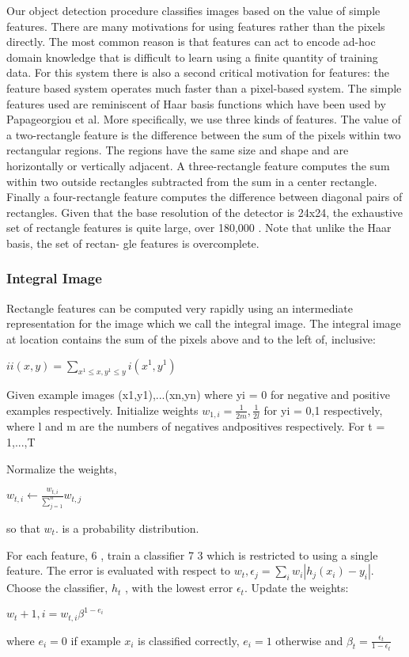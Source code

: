 \documentclass[12pt,a4paper]{article}
\begin{document}
Our object detection procedure classifies images based on
the value of simple features. There are many motivations for using features rather than the pixels directly. The most
common reason is that features can act to encode ad-hoc
domain knowledge that is difficult to learn using a finite
quantity of training data. For this system there is also a
second critical motivation for features: the feature based
system operates much faster than a pixel-based system.
The simple features used are reminiscent of Haar basis
functions which have been used by Papageorgiou et al.
More specifically, we use three kinds of features. The value
of a two-rectangle feature is the difference between the sum
of the pixels within two rectangular regions. The regions
have the same size and shape and are horizontally or vertically adjacent. A three-rectangle feature computes the sum within two outside rectangles subtracted from the sum in a center rectangle. Finally a four-rectangle
feature computes the difference between diagonal pairs of
rectangles. Given that the base resolution of the detector is 24x24,
the exhaustive set of rectangle features is quite large, over
180,000 . Note that unlike the Haar basis, the set of rectan-
gle features is overcomplete.
\par 
\subsubsection{Integral Image}
Rectangle features can be computed very rapidly using an
intermediate representation for the image which we call the
integral image. The integral image at location contains
the sum of the pixels above and to the left of, inclusive:
\par
$ii(x,y) = {\sum_{x^{1}\leq x,y^{1}\leq y}^{}}i(x^{1},y^{1})$
\par 
Given example images (x1,y1),...(xn,yn) where yi = 0 for negative and positive examples respectively. Initialize weights $w_{1,i} = \frac{1}{2m},\frac{1}{2l}$ for yi = 0,1 respectively, where l and m are the numbers of negatives andpositives respectively.
For t = 1,...,T

Normalize the weights,\par
$w_{t,i} \leftarrow \frac{w_{t,i}}{\sum_{j = 1}^{n}}w_{t,j}$
\par 
so that $w_{t}$. is a probability distribution.\par
For each feature, 6 , train a classifier 7 3 which is restricted to using a single feature. The error is evaluated with respect to $w_{t}, \epsilon_{j}  = {\sum_{i}^{}}w_{i} | h_{j}(x_{i})-y_{i} |.$
Choose the classifier, $h_{t}$ , with the lowest error $\epsilon_{t}$.
Update the weights:
\par 
$w_{t}+1,i = w_{t,i}\beta ^{1-e_{i}}$
\par
where $e_{i} = 0$ if example $x_{i}$ is classified correctly, $e_{i} = 1$ otherwise and $\beta_{t} = \frac{\epsilon_{t}}{1-\epsilon_{t}}$ 
\end{document}
